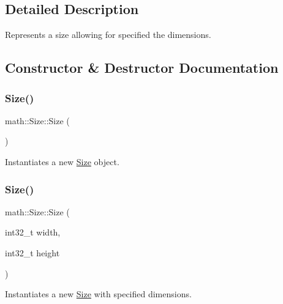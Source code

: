 \subsection{Detailed Description}
Represents a size allowing for specified the dimensions. 



\subsection{Constructor \& Destructor Documentation}
\mbox{\label{structmath_1_1_size_a3978b8ec6dc40374fa15eacab6e6974f}} 
\subsubsection{\texorpdfstring{Size()}{Size()}\hspace{0.1cm}{\footnotesize\ttfamily [1/2]}}
{\footnotesize\ttfamily math\+::\+Size\+::\+Size (\begin{DoxyParamCaption}{ }\end{DoxyParamCaption})\hspace{0.3cm}{\ttfamily [inline]}}



Instantiates a new \mbox{\hyperlink{structmath_1_1_size}{Size}} object. 

\mbox{\label{structmath_1_1_size_a60b16ee3df2a6dc3222555e649579eff}} 
\subsubsection{\texorpdfstring{Size()}{Size()}\hspace{0.1cm}{\footnotesize\ttfamily [2/2]}}
{\footnotesize\ttfamily math\+::\+Size\+::\+Size (\begin{DoxyParamCaption}\item[{int32\+\_\+t}]{width,  }\item[{int32\+\_\+t}]{height }\end{DoxyParamCaption})\hspace{0.3cm}{\ttfamily [inline]}}



Instantiates a new \mbox{\hyperlink{structmath_1_1_size}{Size}} with specified dimensions. 


